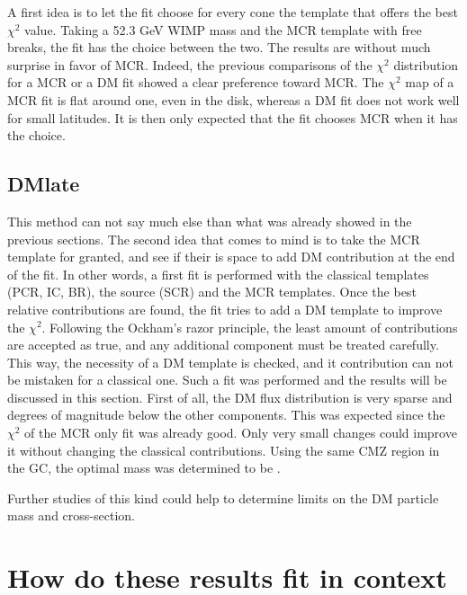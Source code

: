 A first idea is to let the fit choose for every cone the template that offers the best $\chi^2$ value. Taking a 52.3 GeV WIMP mass and the MCR template with free breaks, the fit has the choice between the two. The results are without much surprise in favor of MCR. Indeed, the previous comparisons of the $\chi^2$ distribution for a MCR or a DM fit showed a clear preference toward MCR. The $\chi^2$ map of a MCR fit is flat around one, even in the disk, whereas a DM fit does not work well for small latitudes. It is then only expected that the fit chooses MCR when it has the choice.

\subsection{DMlate}

This method can not say much else than what was already showed in the previous sections. The second idea that comes to mind is to take the MCR template for granted, and see if their is space to add DM contribution at the end of the fit. In other words, a first fit is performed with the classical templates (PCR, IC, BR), the source (SCR) and the MCR templates. Once the best relative contributions are found, the fit tries to add a DM template to improve the $\chi^2$.
Following the Ockham's razor principle, the least amount of contributions are accepted as true, and any additional component must be treated carefully. This way, the necessity of a DM template is checked, and it contribution can not be mistaken for a classical one.
Such a fit was performed and the results will be discussed in this section. First of all, the DM flux distribution  is very sparse and degrees of magnitude below the other components. This was expected since the $\chi^2$ of the MCR only fit was already good. Only very small changes could improve it without changing the classical contributions. Using the same CMZ region in the GC, the optimal mass was determined to be .

Further studies of this kind could help to determine limits on the DM particle mass and cross-section.

\newpage
\section{How do these results fit in context}
%		







